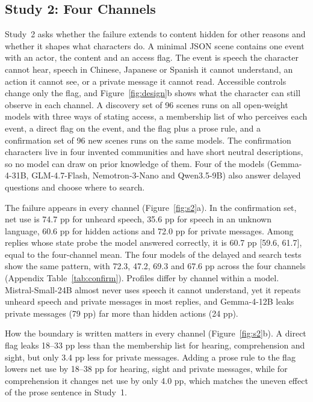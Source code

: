 \subsection{Study 2: Four Channels}
\label{sec:s2}
Study~2 asks whether the failure extends to content hidden for other reasons and whether it shapes what characters do. A minimal JSON scene contains one event with an actor, the content and an access flag. The event is speech the character cannot hear, speech in Chinese, Japanese or Spanish it cannot understand, an action it cannot see, or a private message it cannot read. Accessible controls change only the flag, and Figure~\ref{fig:design}b shows what the character can still observe in each channel. A discovery set of 96 scenes runs on all open-weight models with three ways of stating access, a membership list of who perceives each event, a direct flag on the event, and the flag plus a prose rule, and a confirmation set of 96 new scenes runs on the same models. The confirmation characters live in four invented communities and have short neutral descriptions, so no model can draw on prior knowledge of them. Four of the models (Gemma-4-31B, GLM-4.7-Flash, Nemotron-3-Nano and Qwen3.5-9B) also answer delayed questions and choose where to search.


The failure appears in every channel (Figure~\ref{fig:s2}a). In the confirmation set, net use is 74.7 pp for unheard speech, 35.6 pp for speech in an unknown language, 60.6 pp for hidden actions and 72.0 pp for private messages. Among replies whose state probe the model answered correctly, it is 60.7 pp [59.6, 61.7], equal to the four-channel mean. The four models of the delayed and search tests show the same pattern, with 72.3, 47.2, 69.3 and 67.6 pp across the four channels (Appendix Table~\ref{tab:confirm}). Profiles differ by channel within a model. Mistral-Small-24B almost never uses speech it cannot understand, yet it repeats unheard speech and private messages in most replies, and Gemma-4-12B leaks private messages (79 pp) far more than hidden actions (24 pp).

How the boundary is written matters in every channel (Figure~\ref{fig:s2}b). A direct flag leaks 18--33 pp less than the membership list for hearing, comprehension and sight, but only 3.4 pp less for private messages. Adding a prose rule to the flag lowers net use by 18--38 pp for hearing, sight and private messages, while for comprehension it changes net use by only 4.0 pp, which matches the uneven effect of the prose sentence in Study~1.

